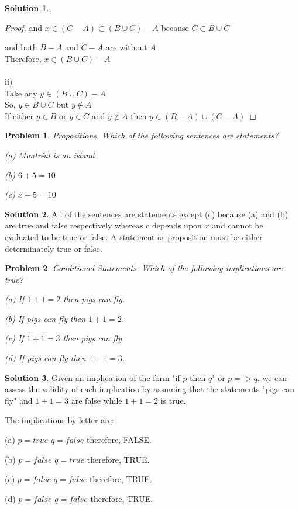 \documentclass{article}
\newtheorem{problem}{Problem}
\theoremstyle{definition}
\newtheorem*{solution}{Solution}
\begin{document}
\begin{solution}
\begin{proof}
 and \(x \in (C-A) \subset (B \cup C)-A \) because \(C \subset B \cup C \)
 
 and both \(B-A \) and \(C-A \) are without \(A\) \\
Therefore, \(x \in (B \cup C)-A \) \\ \\

ii) \\
Take any \(y \in (B \cup C)-A \) \\
So, \(y \in B \cup C \) but \(y \notin A \) \\
If either \(y \in B \) or \(y \in C \) and \(y \notin A \) then \(y \in (B-A) \cup (C-A) \)

\end{proof}

\end{solution}

\begin{problem}

Propositions. Which of the following sentences are statements?

(a) Montréal is an island 

(b) \(6+5=10\)

(c) \(x+5=10\)

\end{problem}

\begin{solution}

All of the sentences are statements except (c) because (a) and (b) are true and false respectively whereas c depends upon \(x\) and cannot be evaluated to be true or false. A statement or proposition must be either determinately true or false.

\end{solution}

\begin{problem}

Conditional Statements. Which of the following implications are true?

(a) If \(1 + 1 = 2\) then pigs can fly.

(b) If pigs can fly then \(1 + 1 = 2\).

(c) If \(1 + 1 = 3\) then pigs can fly.

(d) If pigs can fly then \(1 + 1 = 3\).

\end{problem}

\begin{solution}

Given an implication of the form "if \(p\) then \(q\)" or \(p=>q\), we can assess the validity of each implication by assuming that the statements "pigs can fly" and \(1+1=3\) are false while \(1+1=2\) is true.

The implications by letter are: 

(a) \(p=true\) \(q=false\) therefore, FALSE.

(b) \(p=false\) \(q=true\) therefore, TRUE.

(c) \(p=false\) \(q=false\) therefore, TRUE.

(d) \(p=false\) \(q=false\) therefore, TRUE.

\end{solution}
\end{document}
